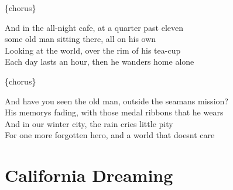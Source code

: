 \documentclass[
  letterpaper,
  twoside=false]{scrbook}
\begin{document}
\{chorus\}

And in the all-night cafe, at a quarter past eleven\\
some old man sitting there, all on his own\\
Looking at the world, over the rim of his tea-cup\\
Each day lasts an hour, then he wanders home alone

\{chorus\}

And have you seen the old man, outside the seaman\textquotesingle s
mission?\\
His memory\textquotesingle s fading, with those medal ribbons that he
wears\\
And in our winter city, the rain cries little pity\\
For one more forgotten hero, and a world that doesn\textquotesingle t
care

\hypertarget{california-dreaming}{%
\chapter{California Dreaming}\label{california-dreaming}}
\end{document}
